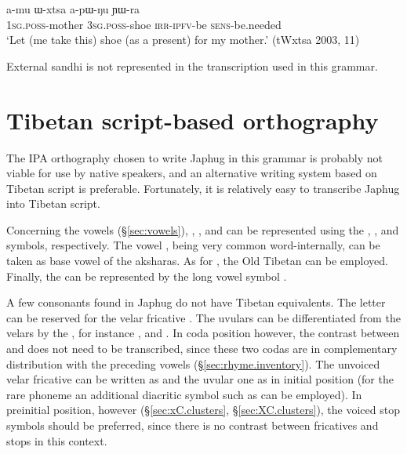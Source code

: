 \begin{exe}
	\ex \label{sec:amu.Wxtsa}
	\gll a-mu ɯ-xtsa a-pɯ-ŋu ɲɯ-ra \\
	\textsc{1sg}.\textsc{poss}-mother \textsc{3sg}.\textsc{poss}-shoe \textsc{irr}-\textsc{ipfv}-be \textsc{sens}-be.needed \\
	\glt `Let (me take this) shoe (as a present) for my mother.' (tWxtsa 2003, 11)
\end{exe}

External sandhi is not represented in the transcription used in this grammar.


\section{Tibetan script-based orthography} \label{sec:tibetan.script}
The IPA orthography chosen to write Japhug in this grammar is probably not viable for use by native speakers, and an alternative writing system based on Tibetan script is preferable. Fortunately, it is relatively easy to transcribe Japhug into Tibetan script.

Concerning the vowels (§\ref{sec:vowels}), , ,  and  can be represented using the , ,  and  symbols, respectively. The vowel , being very common word-internally, can be taken as base vowel of the aksharas. As for , the Old Tibetan  can be employed. Finally, the  can be represented by the long vowel symbol .

A few consonants found in Japhug do not have Tibetan equivalents. The letter  can be reserved for the velar fricative . The uvulars can be differentiated from the velars by the , for instance  ,   and   . In coda position however, the contrast between  and  does not need to be transcribed, since these two codas are in complementary distribution with the preceding vowels (§\ref{sec:rhyme.inventory}). The unvoiced velar fricative can be written as   and the uvular one as   in initial position (for the rare phoneme  an additional diacritic symbol such as  can be employed). In preinitial position, however (§\ref{sec:xC.clusters}, §\ref{sec:XC.clusters}), the voiced stop symbols should be preferred, since there is no contrast between fricatives and stops in this context.


